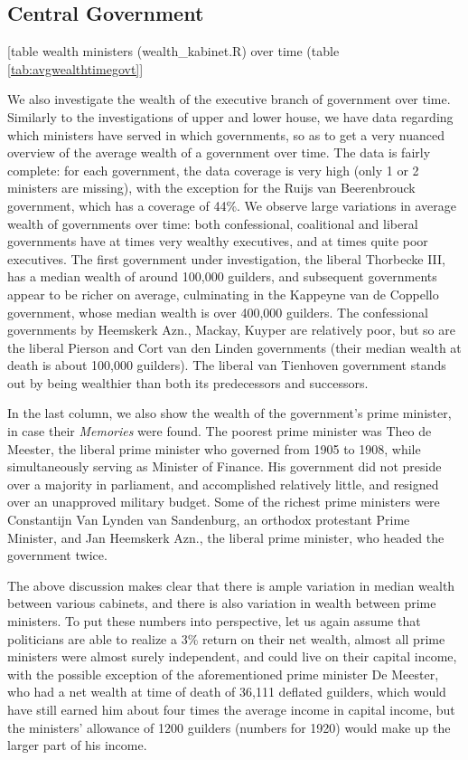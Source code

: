 \subsection{Central Government}
\begin{center}
    [table wealth ministers (wealth\_kabinet.R) over time (table \ref{tab:avgwealthtimegovt}]
 \end{center}   
    We also investigate the wealth of the executive branch of government over time. Similarly to the investigations of upper and lower house, we have data regarding which ministers have served in which governments, so as to get a very nuanced overview of the average wealth of a government over time. The data is fairly complete: for each government, the data coverage is very high (only 1 or 2 ministers are missing), with the exception for the Ruijs van Beerenbrouck government, which has a coverage of 44\%. We observe large variations in average wealth of governments over time: both confessional, coalitional and liberal governments have at times very wealthy executives, and at times quite poor executives. The first government under investigation, the liberal Thorbecke III, has a median wealth of around 100,000 guilders, and subsequent governments appear to be richer on average, culminating in the Kappeyne van de Coppello government, whose median wealth is over 400,000 guilders. The confessional governments by Heemskerk Azn., Mackay, Kuyper are relatively poor, but so are the liberal Pierson and Cort van den Linden governments (their median wealth at death is about 100,000 guilders). The liberal van Tienhoven government stands out by being wealthier than both its predecessors and successors. 
    
    In the last column, we also show the wealth of the government's prime minister, in case their \textit{Memories} were found. The poorest prime minister was Theo de Meester, the liberal prime minister  who governed from 1905 to 1908, while simultaneously serving as Minister of Finance. His government did not preside over a majority in parliament, and accomplished relatively little, and resigned over an unapproved military budget. Some of the richest prime ministers were Constantijn Van Lynden van Sandenburg, an orthodox protestant Prime Minister, and Jan Heemskerk Azn., the liberal prime minister, who headed the government twice. 
    
    The above discussion makes clear that there is ample variation in median wealth between various cabinets, and there is also variation in wealth between prime ministers. To put these numbers into perspective, let us again assume that politicians are able to realize a 3\% return on their net wealth, almost all prime ministers were almost surely independent, and could live on their capital income, with the possible exception of the aforementioned prime minister De Meester, who had a net wealth at time of death of 36,111 deflated guilders, which would have still earned him about four times the average income in capital income, but the ministers' allowance of 1200 guilders (numbers for 1920) would make up the larger part of his income.\autocite{berg1999ongelijkheid} 
    
